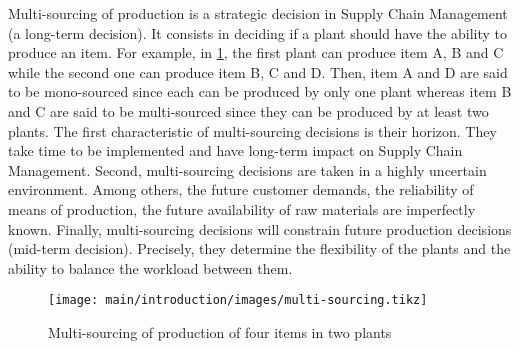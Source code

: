 Multi-sourcing of production is a strategic decision in Supply Chain Management (\ie a long-term decision).
It consists in deciding if a plant should have the ability to produce an item.
For example, in \cref{fig:intro:en:multi-sourcing}, the first plant can produce item A, B and C while the second one can produce item B, C and D.
Then, item A and D are said to be mono-sourced since each can be produced by only one plant whereas item B and C are said to be multi-sourced since they can be produced by at least two plants.
The first characteristic of multi-sourcing decisions is their horizon.
They take time to be implemented and have long-term impact on Supply Chain Management.
Second, multi-sourcing decisions are taken in a highly uncertain environment.
Among others, the future customer demands, the reliability of means of production, the future availability of raw materials are imperfectly known.
Finally, multi-sourcing decisions will constrain future production decisions (\ie mid-term decision).
Precisely, they determine the flexibility of the plants and the ability to balance the workload between them.


\begin{figure}[!ht]
  \centering
  \texttt{[image: main/introduction/images/multi-sourcing.tikz]}
  \caption{Multi-sourcing of production of four items in two plants}
  \label{fig:intro:en:multi-sourcing}
\end{figure}




